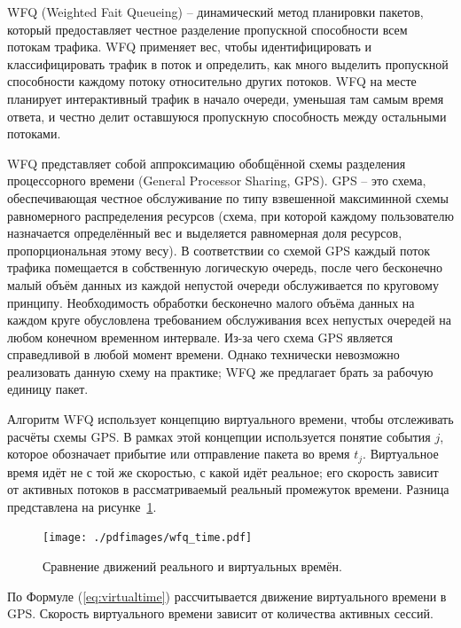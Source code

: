     WFQ (Weighted Fait Queueing) -- динамический метод планировки пакетов, который
    предоставляет честное разделение пропускной способности всем потокам трафика.
    WFQ применяет вес, чтобы идентифицировать и классифицировать трафик
    в поток и определить, как много выделить пропускной способности каждому
    потоку относительно других потоков. WFQ на месте планирует интерактивный трафик в начало очереди,
    уменьшая там самым время ответа, и честно делит оставшуюся пропускную
    способность между остальными потоками. \cite{ciscoguide}


	WFQ представляет собой аппроксимацию обобщённой схемы разделения 
	процессорного времени (General Processor Sharing, GPS). GPS
	-- это схема, обеспечивающая честное обслуживание по типу
	взвешенной максиминной схемы равномерного распределения ресурсов
	(схема, при которой каждому пользователю назначается определённый вес
	и выделяется равномерная доля ресурсов, пропорциональная этому весу).
	В соответствии со схемой GPS каждый поток трафика помещается в
	собственную логическую очередь, после чего бесконечно малый объём
	данных из каждой непустой очереди обслуживается по круговому принципу.
	Необходимость обработки бесконечно малого объёма данных на каждом
	круге обусловлена требованием обслуживания всех непустых очередей
	на любом конечном временном интервале. Из-за чего схема GPS является
	справедливой в любой момент времени. Однако технически
	невозможно реализовать данную схему на практике; WFQ же
	предлагает брать за рабочую единицу пакет.\cite{Vagesna}

	Алгоритм WFQ использует концепцию виртуального времени, чтобы
	отслеживать расчёты схемы GPS. В рамках этой концепции
	используется понятие события $j$, которое обозначает
	прибытие или отправление пакета во время $t_j$.
	Виртуальное время идёт не с той же скоростью, с какой
	идёт реальное; его скорость зависит от активных потоков в рассматриваемый реальный промежуток времени.
	Разница представлена на рисунке~\ref{pic:wfqtime}.

    \begin{figure}[ht!]
		\center
        \texttt{[image: ./pdfimages/wfq\_time.pdf]}
        \caption{Сравнение движений реального и виртуальных времён.}
		\label{pic:wfqtime}
    \end{figure}

	По Формуле (\ref{eq:virtualtime}) рассчитывается движение виртуального
	времени в GPS. Скорость виртуального времени зависит от количества активных сессий.
 
